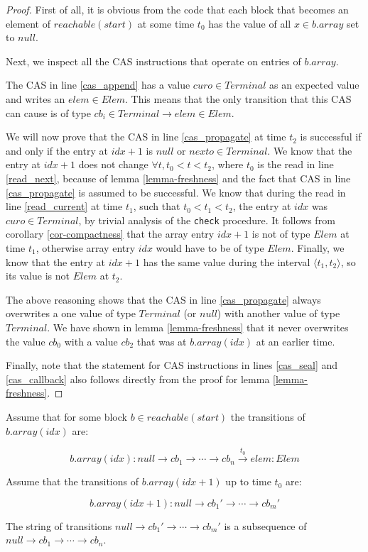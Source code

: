 \documentclass[runningheads,a4paper]{llncs}
\begin{document}
\begin{proof}
First of all, it is obvious from the code that each block that becomes
an element of $reachable(start)$ at some time $t_0$ has the value of
all $x \in b.array$ set to $null$.

Next, we inspect all the CAS instructions that operate on entries of
$b.array$.

The CAS in line \ref{cas_append} has a value $curo \in Terminal$ as
an expected value and writes an $elem \in Elem$.
This means that the only transition that this CAS
can cause is of type $cb_i \in Terminal \rightarrow elem \in Elem$.

We will now prove that the CAS in line \ref{cas_propagate} at time $t_2$ is successful if and
only if the entry at $idx + 1$ is $null$ or $nexto \in
Terminal$.
We know that the entry at $idx + 1$ does not change $\forall t, t_0 < t < t_2$,
where $t_0$ is the read in line \ref{read_next},
because of lemma \ref{lemma-freshness} and the fact that CAS in line \ref{cas_propagate} is assumed to be successful.
We know that during the read in line \ref{read_current} at time $t_1$,
such that $t_0 < t_1 < t_2$, the entry at $idx$ was $curo \in
Terminal$, by trivial analysis of the \verb=check= procedure.
It follows from corollary \ref{cor-compactness} that the array entry $idx
+ 1$ is not of type $Elem$ at time $t_1$, otherwise array entry $idx$
would have to be of type $Elem$.
Finally, we know that the entry at $idx + 1$ has the same value during
the interval $\langle t_1, t_2 \rangle$, so its value is not $Elem$ at $t_2$.

The above reasoning shows that the CAS in line \ref{cas_propagate}
always overwrites a one value of type $Terminal$ (or $null$) with
another value of type $Terminal$.
We have shown in lemma \ref{lemma-freshness} that it never
overwrites the value $cb_0$ with a value $cb_2$ that was at
$b.array(idx)$ at an earlier time.

Finally, note that the statement for CAS instructions in lines \ref{cas_seal} and
\ref{cas_callback} also follows directly from the proof for lemma \ref{lemma-freshness}.
\end{proof}


\begin{lemma}[Subsequence]\label{lemma-subsequence}
Assume that for some block $b \in reachable(start)$ the transitions of
$b.array(idx)$ are:

\begin{equation*}
b.array(idx): null \rightarrow cb_1 \rightarrow \cdots \rightarrow
cb_n \stackrel{t_0}{\rightarrow} elem: Elem
\end{equation*}

Assume that the transitions of $b.array(idx + 1)$ up to time $t_0$ are:

\begin{equation*}
b.array(idx + 1): null \rightarrow cb_1' \rightarrow \cdots
\rightarrow cb_m'
\end{equation*}

The string of transitions $null \rightarrow cb_1' \rightarrow \cdots
\rightarrow cb_m'$ is a subsequence of $null \rightarrow cb_1
\rightarrow \cdots \rightarrow cb_n$.
\end{lemma}
\end{document}
